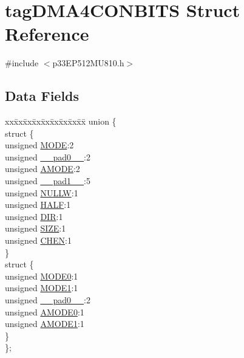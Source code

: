 \hypertarget{structtag_d_m_a4_c_o_n_b_i_t_s}{}\section{tag\+D\+M\+A4\+C\+O\+N\+B\+I\+TS Struct Reference}
\label{structtag_d_m_a4_c_o_n_b_i_t_s}


{\ttfamily \#include $<$p33\+E\+P512\+M\+U810.\+h$>$}

\subsection*{Data Fields}
\begin{DoxyCompactItemize}
\item 
\begin{tabbing}
xx\=xx\=xx\=xx\=xx\=xx\=xx\=xx\=xx\=\kill
union \{\\
\>struct \{\\
\>\>unsigned \hyperlink{structtag_d_m_a4_c_o_n_b_i_t_s_adc56ba18ff3f1599c85d222bee624424}{MODE}:2\\
\>\>unsigned \hyperlink{structtag_d_m_a4_c_o_n_b_i_t_s_adf71f3d8410c1f1dbbc96680a92c49af}{\_\_pad0\_\_}:2\\
\>\>unsigned \hyperlink{structtag_d_m_a4_c_o_n_b_i_t_s_ab3ff4e1f1b9a1037418ca7b6cb2e8f77}{AMODE}:2\\
\>\>unsigned \hyperlink{structtag_d_m_a4_c_o_n_b_i_t_s_acaf2d0924a107ec6e8d2e31febaf66f9}{\_\_pad1\_\_}:5\\
\>\>unsigned \hyperlink{structtag_d_m_a4_c_o_n_b_i_t_s_a1d3f7d04416314131889d1671a9287ad}{NULLW}:1\\
\>\>unsigned \hyperlink{structtag_d_m_a4_c_o_n_b_i_t_s_a1a715a64b2576f59401ac93d6f9a086a}{HALF}:1\\
\>\>unsigned \hyperlink{structtag_d_m_a4_c_o_n_b_i_t_s_ad6868749602045a76f36ffdf964dfd39}{DIR}:1\\
\>\>unsigned \hyperlink{structtag_d_m_a4_c_o_n_b_i_t_s_a5863cac6dc2cb330bdd0b1c66da70ffe}{SIZE}:1\\
\>\>unsigned \hyperlink{structtag_d_m_a4_c_o_n_b_i_t_s_a092934036fdfb8df5259db288fe438ca}{CHEN}:1\\
\>\} \\
\>struct \{\\
\>\>unsigned \hyperlink{structtag_d_m_a4_c_o_n_b_i_t_s_abc938903e74bff48935569d0c5b19035}{MODE0}:1\\
\>\>unsigned \hyperlink{structtag_d_m_a4_c_o_n_b_i_t_s_a7a9f7514566d0626724ce6c4b81b5ea2}{MODE1}:1\\
\>\>unsigned \hyperlink{structtag_d_m_a4_c_o_n_b_i_t_s_adf71f3d8410c1f1dbbc96680a92c49af}{\_\_pad0\_\_}:2\\
\>\>unsigned \hyperlink{structtag_d_m_a4_c_o_n_b_i_t_s_a0a1f894a2695c1388a5412244636805b}{AMODE0}:1\\
\>\>unsigned \hyperlink{structtag_d_m_a4_c_o_n_b_i_t_s_a3fde4abc0dc3db6fef6afc28c565ce3e}{AMODE1}:1\\
\>\} \\
\}; \\


\end{tabbing}
\end{DoxyCompactItemize}

